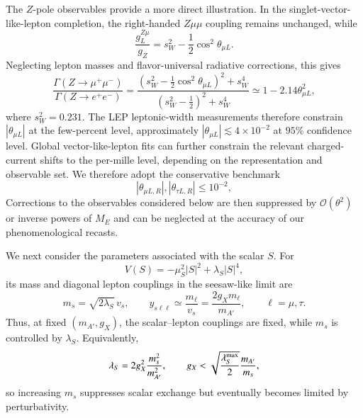 \documentclass[onecolumn, aps, nofootinbib, prd, preprint, floats, floatfix, amsmath, amssymb, superscriptaddress, preprintnumbers]{revtex4-2}
\begin{document}
The $Z$-pole observables provide a more direct illustration. In the singlet-vector-like-lepton completion, the right-handed $Z\mu\mu$ coupling remains unchanged, while
\begin{equation}
\frac{g_L^{Z\mu}}{g_Z}
=s_W^2-\frac{1}{2}\cos^2\theta_{\mu L}.
\end{equation}
Neglecting lepton masses and flavor-universal radiative corrections, this gives
\begin{equation}
\frac{\Gamma(Z\to\mu^+\mu^-)}
{\Gamma(Z\to e^+e^-)}
=
\frac{\left(s_W^2-\frac12\cos^2\theta_{\mu L}\right)^2+s_W^4}
{\left(s_W^2-\frac12\right)^2+s_W^4}
\simeq1-2.14\theta_{\mu L}^2,
\end{equation}
where $s_W^2=0.231$. The LEP leptonic-width measurements therefore constrain $|\theta_{\mu L}|$ at the few-percent level, approximately
$|\theta_{\mu L}|\lesssim4\times10^{-2}$ at $95\%$ confidence level. Global vector-like-lepton fits can further constrain the relevant charged-current shifts to the per-mille level, depending on the representation and observable set. We therefore adopt the conservative benchmark
\begin{equation}
|\theta_{\mu L,R}|,|\theta_{\tau L,R}|\leq10^{-2},
\label{eq:mixing-benchmark}
\end{equation}
Corrections to the observables considered below are then suppressed by $\mathcal{O}(\theta^2)$ or inverse powers of $M_E$ and can be neglected at the accuracy of our phenomenological recasts.

We next consider the parameters associated with the scalar $S$. For
\begin{equation}
V(S)=-\mu_S^2|S|^2+\lambda_S|S|^4,
\end{equation}
its mass and diagonal lepton couplings in the seesaw-like limit are
\begin{equation}
m_s=\sqrt{2\lambda_S}\,v_s,
\qquad
y_{s\ell\ell}\simeq\frac{m_\ell}{v_s}
=\frac{2g_Xm_\ell}{m_{A'}},
\qquad \ell=\mu,\tau.
\label{y-and-gX}
\end{equation}
Thus, at fixed $(m_{A'},g_X)$, the scalar--lepton couplings are fixed, while $m_s$ is controlled by $\lambda_S$. Equivalently,
\begin{equation}
\lambda_S=2g_X^2\frac{m_s^2}{m_{A'}^2},
\qquad
g_X<\sqrt{\frac{\lambda_S^{\rm max}}{2}}\frac{m_{A'}}{m_s},
\label{eq:scalar-perturbativity-bound}
\end{equation}
so increasing $m_s$ suppresses scalar exchange but eventually becomes limited by perturbativity.
\end{document}
